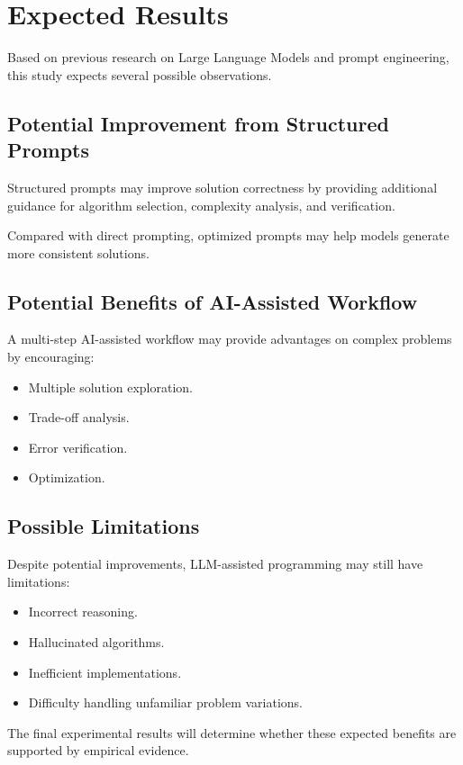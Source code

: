 \section{Expected Results}


Based on previous research on Large Language Models and prompt engineering,
this study expects several possible observations.



\subsection{Potential Improvement from Structured Prompts}


Structured prompts may improve solution correctness by providing additional
guidance for algorithm selection, complexity analysis, and verification.


Compared with direct prompting, optimized prompts may help models generate more
consistent solutions.



\subsection{Potential Benefits of AI-Assisted Workflow}


A multi-step AI-assisted workflow may provide advantages on complex problems by
encouraging:

\begin{itemize}

\item Multiple solution exploration.

\item Trade-off analysis.

\item Error verification.

\item Optimization.

\end{itemize}



\subsection{Possible Limitations}


Despite potential improvements, LLM-assisted programming may still have
limitations:


\begin{itemize}

\item Incorrect reasoning.

\item Hallucinated algorithms.

\item Inefficient implementations.

\item Difficulty handling unfamiliar problem variations.

\end{itemize}



The final experimental results will determine whether these expected benefits
are supported by empirical evidence.
